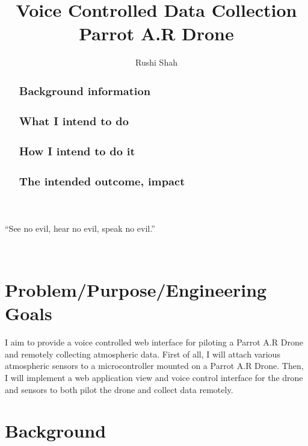 \documentclass{article}
\title{Voice Controlled Data Collection Parrot A.R Drone}
\author{Rushi Shah}
\begin{document}
	\begin{singlespace}
		\maketitle
		\setlength{\epigraphwidth}{0.35\textwidth}
		\epigraph{``See no evil, hear no evil, speak no evil.''}{🙈🙉🙊}
	\end{singlespace}

	\begin{abstract}
	\subsection{Background information}
	\subsection{What I intend to do}
	\subsection{How I intend to do it}
	\subsection{The intended outcome, impact}
	\end{abstract}

	\section{Problem/Purpose/Engineering Goals}
	I aim to provide a voice controlled web interface for piloting a Parrot A.R Drone and remotely collecting atmospheric data. First of all, I will attach various atmospheric sensors to a microcontroller mounted on a Parrot A.R Drone. Then, I will implement a web application view and voice control interface for the drone and sensors to both pilot the drone and collect data remotely. 

	\section{Background}
\end{document}
